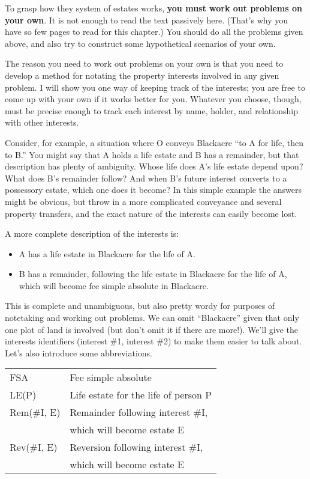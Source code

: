 To grasp how they system of estates works, \textbf{you must work out problems on
your own}. It is not enough to read the text passively here. (That's why you
have so few pages to read for this chapter.) You should do all the problems
given above, and also try to construct some hypothetical scenarios of your own.

The reason you need to work out problems on your own is that you need to develop
a method for notating the property interests involved in any given problem. I
will show you one way of keeping track of the interests; you are free to come up
with your own if it works better for you. Whatever you choose, though, must be
precise enough to track each interest by name, holder, and relationship with
other interests.

Consider, for example, a situation where O conveys Blackacre ``to A for life,
then to B.'' You might say that A holds a life estate and B has a remainder, but
that description has plenty of ambiguity. Whose life does A's life estate depend
upon? What does B's remainder follow? And when B's future interest converts to a
possessory estate, which one does it become? In this simple example the answers
might be obvious, but throw in a more complicated conveyance and several
property transfers, and the exact nature of the interests can easily become
lost.

A more complete description of the interests is:
\begin{itemize}
\item A has a life estate in Blackacre for the life of A.
\item B has a remainder, following the life estate in Blackacre for
the life of A, which will become fee simple absolute in Blackacre.
\end{itemize}
This is complete and unambiguous, but also pretty wordy for purposes of
notetaking and working out problems. We can omit ``Blackacre'' given that only
one plot of land is involved (but don't omit it if there are more!). We'll give
the interests identifiers (interest \#1, interest \#2) to make them easier to
talk about. Let's also introduce some abbreviations.
\begin{center}
\begin{tabular}{ll}
FSA & Fee simple absolute \\
LE(P) & Life estate for the life of person P \\
Rem(\#I, E) & Remainder following interest \#I, \\
 & which will become estate E \\
Rev(\#I, E) & Reversion following interest \#I, \\
 & which will become estate E \\
\end{tabular}
\end{center}

